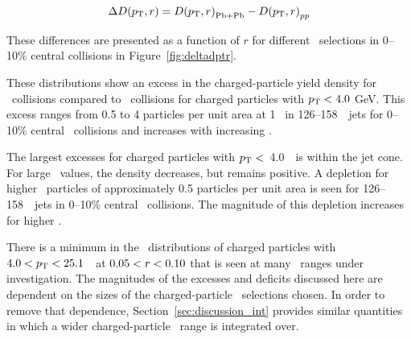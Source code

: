 \begin{align}
\mbox{$\Delta\mbox{$D( \mbox{$p_{\mathrm{T}}$}, r)$}$} = \mbox{$D( \mbox{$p_{\mathrm{T}}$}, r)$}_{\mathrm{Pb+Pb}} - \mbox{$D( \mbox{$p_{\mathrm{T}}$}, r)$}_{pp}
\end{align}

These differences are presented as a function of $r$ for different \pt\ selections in 0--10\% central collisions in Figure~\ref{fig:deltadptr}.

These distributions show an excess  in the charged-particle yield density for \pbpb\ collisions compared to \pp\ collisions for charged particles with $\mbox{$p_{\mathrm{T}}$} <4.0$ GeV.
This excess ranges from 0.5 to 4 particles per unit area at 1 \GeV\ in 126--158~\GeV\ jets for 0--10\% central \pbpb\ collisions and increases with increasing \ptjet.

The largest excesses for charged particles with $\mbox{$p_{\mathrm{T}}$} <$~4.0~\GeV\ is within the jet cone.
 For large \rvar\ values, the
density decreases, but remains positive.
A depletion for higher \pt\ particles of approximately 0.5 particles per unit area is seen for 126--158~\GeV\ jets in 0--10\% central \pbpb\ collisions.
The magnitude of this depletion increases for higher \ptjet.

There is a minimum in the \DeltaDptr\ distributions of charged 
particles with \mbox{$ 4.0 < \mbox{$p_{\mathrm{T}}$} <  25.1$}~\GeV\ at $0.05 < \mbox{$r$} < 0.10$ that is seen at many \ptjet\ ranges under investigation.
The magnitudes of the excesses and deficits discussed here are dependent on the sizes of the charged-particle \pt\ selections
chosen.
 In order to remove that dependence, Section~\ref{sec:discussion_int} provides similar quantities in which a
wider charged-particle \pt\ range is integrated over.

